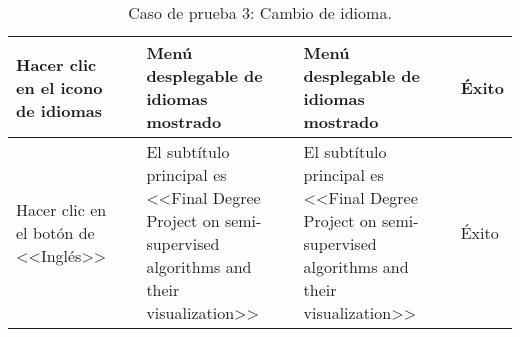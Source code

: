 \begin{table}[H]
\begin{tabular}{p{}p{}p{}p{}p{}}
Hacer clic en el icono de idiomas                      &                        & Menú desplegable de idiomas mostrado                                 & Menú desplegable de idiomas mostrado                                 & Éxito                            \\ \hline
Hacer clic en el botón de <<Inglés>>                   &                        & El subtítulo principal es <<Final Degree Project on semi-supervised algorithms and their visualization>>  & El subtítulo principal es <<Final Degree Project on semi-supervised algorithms and their visualization>>  & Éxito                            \\ \hline
\end{tabular}
\caption{Caso de prueba 3: Cambio de idioma.}
\end{table}

